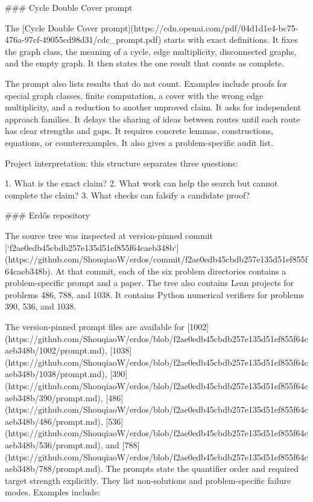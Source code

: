 \documentclass[11pt]{article}
\begin{document}
\begin{markdown}
### Cycle Double Cover prompt

The [Cycle Double Cover prompt](https://cdn.openai.com/pdf/04d1d1e4-bc75-476a-97cf-49055cd98d31/cdc_prompt.pdf)
starts with exact definitions. It fixes the graph class, the meaning of a cycle, edge multiplicity,
disconnected graphs, and the empty graph. It then states the one result that counts as complete.

The prompt also lists results that do not count. Examples include proofs for special graph classes,
finite computation, a cover with the wrong edge multiplicity, and a reduction to another unproved
claim. It asks for independent approach families. It delays the sharing of ideas between routes
until each route has clear strengths and gaps. It requires concrete lemmas, constructions,
equations, or counterexamples. It also gives a problem-specific audit list.

Project interpretation: this structure separates three questions:

1. What is the exact claim?
2. What work can help the search but cannot complete the claim?
3. What checks can falsify a candidate proof?

### Erdős repository

The source tree was inspected at version-pinned commit
[`f2ae0edb45cbdb257e135d51ef855f64caeb348b`](https://github.com/ShouqiaoW/erdos/commit/f2ae0edb45cbdb257e135d51ef855f64caeb348b).
At that commit, each of the six problem directories contains a problem-specific prompt and a paper.
The tree also contains Lean projects for problems 486, 788, and 1038. It contains Python numerical
verifiers for problems 390, 536, and 1038.

The version-pinned prompt files are available for
[1002](https://github.com/ShouqiaoW/erdos/blob/f2ae0edb45cbdb257e135d51ef855f64caeb348b/1002/prompt.md),
[1038](https://github.com/ShouqiaoW/erdos/blob/f2ae0edb45cbdb257e135d51ef855f64caeb348b/1038/prompt.md),
[390](https://github.com/ShouqiaoW/erdos/blob/f2ae0edb45cbdb257e135d51ef855f64caeb348b/390/prompt.md),
[486](https://github.com/ShouqiaoW/erdos/blob/f2ae0edb45cbdb257e135d51ef855f64caeb348b/486/prompt.md),
[536](https://github.com/ShouqiaoW/erdos/blob/f2ae0edb45cbdb257e135d51ef855f64caeb348b/536/prompt.md), and
[788](https://github.com/ShouqiaoW/erdos/blob/f2ae0edb45cbdb257e135d51ef855f64caeb348b/788/prompt.md).
The prompts state the quantifier order and required target strength explicitly. They list
non-solutions and problem-specific failure modes. Examples include:


\end{markdown}
\end{document}
